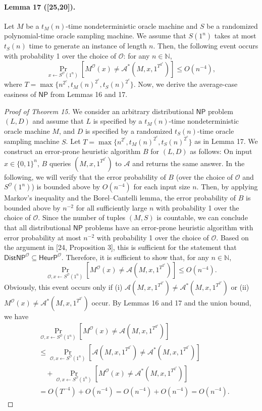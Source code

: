 \documentclass[10pt,a4paper]{article}
\begin{document}
\paragraph{Lemma 17 ([25,20]).}
Let $M$ be a $t_M(n)$-time nondeterministic oracle machine and $S$ be a randomized polynomial-time oracle sampling machine. We assume that $S(1^n)$ takes at most $t_S(n)$ time to generate an instance of length $n$. Then, the following event occurs with probability 1 over the choice of $\mathcal O$: for any $n\in\mathbb N$,
\[\Pr_{x\leftarrow S^{\mathcal O}(1^n)}[M^{\mathcal O}(x)\neq\mathcal A^*(M,x,1^{T^{2^c}})]\leq O(n^{-4}),\]
where $T=\max\{n^{2^c},t_M(n)^{2^c},t_S(n)^{2^c}\}$.
Now, we derive the average-case easiness of $\mathsf{NP}$ from Lemmas 16 and 17.
\begin{proof}[Proof of Theorem 15]
We consider an arbitrary distributional $\mathsf{NP}$ problem $(L,D)$ and assume that $L$ is specified by a $t_M(n)$-time nondeterministic oracle machine $M$, and $D$ is specified by a randomized $t_S(n)$-time oracle sampling machine $S$. Let $T=\max\{n^{2^c},t_M(n)^{2^c},t_S(n)^{2^c}\}$ as in Lemma 17.
We construct an error-prone heuristic algorithm $B$ for $(L,D)$ as follows: On input $x\in\{0,1\}^n$, $B$ queries $(M,x,1^{T^{2^c}})$ to $\mathcal A$ and returns the same answer. In the following, we will verify that the error probability of $B$ (over the choice of $\mathcal O$ and $S^{\mathcal O}(1^n)$) is bounded above by $O(n^{-4})$ for each input size $n$. Then, by applying Markov's inequality and the Borel--Cantelli lemma, the error probability of $B$ is bounded above by $n^{-2}$ for all sufficiently large $n$ with probability 1 over the choice of $\mathcal O$. Since the number of tuples $(M,S)$ is countable, we can conclude that all distributional $\mathsf{NP}$ problems have an error-prone heuristic algorithm with error probability at most $n^{-2}$ with probability 1 over the choice of $\mathcal O$. Based on the argument in [24, Proposition 3], this is sufficient for the statement that $\mathsf{DistNP}^{\mathcal O}\subseteq\mathsf{HeurP}^{\mathcal O}$.
Therefore, it is sufficient to show that, for any $n\in\mathbb N$,
\[\Pr_{\mathcal O,x\leftarrow S^{\mathcal O}(1^n)}[M^{\mathcal O}(x)\neq\mathcal A(M,x,1^{T^{2^c}})]\leq O(n^{-4}).\]
Obviously, this event occurs only if (i) $\mathcal A(M,x,1^{T^{2^c}})\neq\mathcal A^*(M,x,1^{T^{2^c}})$ or (ii) $M^{\mathcal O}(x)\neq\mathcal A^*(M,x,1^{T^{2^c}})$ occur. By Lemmas 16 and 17 and the union bound, we have
\begin{align*}
&\Pr_{\mathcal O,x\leftarrow S^{\mathcal O}(1^n)}[M^{\mathcal O}(x)\neq\mathcal A(M,x,1^{T^{2^c}})]\\
&\leq\Pr_{\mathcal O,x\leftarrow S^{\mathcal O}(1^n)}[\mathcal A(M,x,1^{T^{2^c}})\neq\mathcal A^*(M,x,1^{T^{2^c}})]\\
&\quad+\Pr_{\mathcal O,x\leftarrow S^{\mathcal O}(1^n)}[M^{\mathcal O}(x)\neq\mathcal A^*(M,x,1^{T^{2^c}})]\\
&=O(T^{-4})+O(n^{-4})=O(n^{-4})+O(n^{-4})=O(n^{-4}).
\end{align*}
\end{proof}
\end{document}
